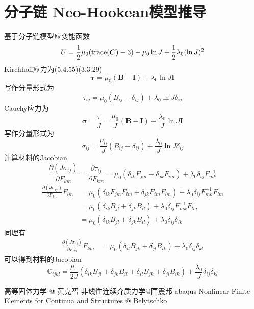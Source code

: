 \documentclass{article}
\begin{document}
\section{分子链 Neo-Hookean模型推导}
基于分子链模型应变能函数
$$U=\frac{1}{2}\mu_0({\rm trace}(\bm{C})-3)-\mu_0 \ln J+\frac{1}{2}\lambda_0(\ln J)^2$$
Kirchhoff应力为\cite{bely}(5.4.55)\cite{huang}(3.3.29)
$$\bm{\tau}=\mu_0(\bm{B}-\bm{I}) + \lambda_0 \ln J \bm{I}$$
写作分量形式为
$$\tau_{ij}=\mu_0(B_{ij}-\delta_{ij}) + \lambda_0 \ln J \delta_{ij}$$
Cauchy应力为
$$\bm{\sigma}=\frac{\tau}{J}=\frac{\mu_0}{J}(\bm{B}-\bm{I}) + \frac{\lambda_0}{J} \ln J \bm{I}$$
写作分量形式为
$$\sigma_{ij}=\frac{\mu_0}{J}(B_{ij}-\delta_{ij}) + \frac{\lambda_0}{J} \ln J \delta_{ij}$$
计算材料的Jacobian
$$\frac{\partial (J\sigma_{ij})}{\partial F_{km}}=\frac{\partial \tau_{ij}}{\partial F_{km}}=\mu_0(\delta_{ik}F_{jm}+\delta_{jk}F_{im}) + \lambda_0\delta_{ij}F_{mk}^{-1}$$
\begin{equation*}
    \begin{aligned}
        \frac{\partial (J\sigma_{ij})}{\partial F_{km}}F_{lm} & =\mu_0(\delta_{ik}F_{jm}F_{lm}+\delta_{jk}F_{im}F_{lm}) + \lambda_0\delta_{ij}F_{mk}^{-1}F_{lm} \\
                                                              & =\mu_0(\delta_{ik}B_{jl}+\delta_{jk}B_{il}) + \lambda_0\delta_{ij}F_{mk}^{-1}F_{lm}\\
                                                              & =\mu_0(\delta_{ik}B_{jl}+\delta_{jk}B_{il}) + \lambda_0\delta_{ij}\delta_{lk}
    \end{aligned}
\end{equation*}
同理有
\begin{equation*}
    \begin{aligned}
        \frac{\partial (J\sigma_{ij})}{\partial F_{lm}}F_{km} & =\mu_0(\delta_{il}B_{jk}+\delta_{jl}B_{ik}) + \lambda_0\delta_{ij}\delta_{kl}
    \end{aligned}
\end{equation*}
可以得到材料的Jacobian
$$\mathbb{C}_{ijkl}=\frac{\mu_0}{2J}(\delta_{ik}B_{jl}+\delta_{jk}B_{il}+\delta_{il}B_{jk}+\delta_{jl}B_{ik}) +\frac{\lambda_0}{J}\delta_{ij}\delta_{kl}$$



\begin{thebibliography}{1}
     高等固体力学 @ 黄克智
     非线性连续介质力学@匡震邦
     abaqus
      Nonlinear Finite Elements for Continua and Structures @ Belytschko 
\end{thebibliography}
\end{document}
